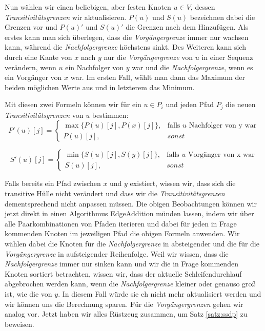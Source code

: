 Nun wählen wir einen beliebigen, aber festen Knoten $u \in V$, dessen \emph{Transitivitätsgrenzen} wir aktualisieren. $P(u)$ und $S(u)$ bezeichnen dabei die Grenzen vor und $P(u)'$ und $S(u)'$ die Grenzen nach dem Hinzufügen. Als erstes kann man sich überlegen, dass die \emph{Vorgängergrenze} immer nur wachsen kann, während die \emph{Nachfolgergrenze} höchstens sinkt. Des Weiteren kann sich durch eine Kante von $x$ nach $y$ nur die \emph{Vorgängergrenze} von $u$ in einer Sequenz verändern, wenn $u$ ein Nachfolger von $y$ war und die \emph{Nachfolgergrenze}, wenn es ein Vorgänger von $x$ war. Im ersten Fall, wählt man dann das Maximum der beiden möglichen Werte aus und in letzterem das Minimum.  

Mit diesen zwei Formeln können wir für ein $u \in P_i$ und jeden Pfad $P_j$ die neuen \emph{Transitivitätsgrenzen} von $u$ bestimmen:
\begin{equation}
	P'(u)[j] = \begin{cases}
			\max\{P(u)[j], P(x)[j]\}, & \text{falls $u$ Nachfolger von y war} \\
			P(u)[j], & sonst
		\end{cases}
\end{equation} 

\begin{equation}
	S'(u)[j] = \begin{cases}
			\min\{S(u)[j], S(y)[j]\}, & \text{falls $u$ Vorgänger von x war} \\
			S(u)[j], & sonst
		\end{cases}
\end{equation}

Falls bereits ein Pfad zwischen $x$ und $y$ existiert, wissen wir, dass sich die transitive Hülle nicht verändert und dass wir die \emph{Transitivitätsgrenzen} dementsprechend nicht anpassen müssen. Die obigen Beobachtungen können wir jetzt direkt in einen Algorithmus \textrm{EdgeAddition} münden lassen, indem wir über alle Paarkombinationen von Pfaden iterieren und dabei für jeden in Frage kommenden Knoten im jeweiligen Pfad die obigen Formeln anwenden. Wir wählen dabei die Knoten für die \emph{Nachfolgergrenze} in absteigender und die für die \emph{Vorgängergrenze} in aufsteigender Reihenfolge. Weil wir wissen, dass die \emph{Nachfolgergrenze} immer nur sinken kann und wir die in Frage kommenden Knoten sortiert betrachten, wissen wir, dass der aktuelle Schleifendurchlauf abgebrochen werden kann, wenn die \emph{Nachfolgergrenze} kleiner oder genauso groß ist, wie die von $y$. In diesem Fall würde sie eh nicht mehr aktualisiert werden und wir können uns die Berechnung sparen. Für die \emph{Vorgängergrenzen} gehen wir analog vor. Jetzt haben wir alles Rüstzeug zusammen, um Satz \ref{satz:ssdp} zu beweisen.

